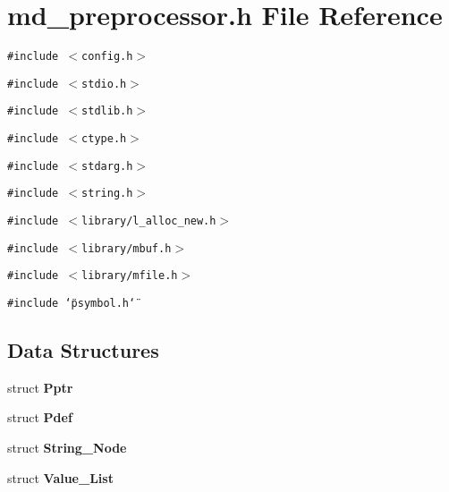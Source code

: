 \section{md\_\-preprocessor.h File Reference}
\label{md__preprocessor_8h}
{\tt \#include $<$config.h$>$}\par
{\tt \#include $<$stdio.h$>$}\par
{\tt \#include $<$stdlib.h$>$}\par
{\tt \#include $<$ctype.h$>$}\par
{\tt \#include $<$stdarg.h$>$}\par
{\tt \#include $<$string.h$>$}\par
{\tt \#include $<$library/l\_\-alloc\_\-new.h$>$}\par
{\tt \#include $<$library/mbuf.h$>$}\par
{\tt \#include $<$library/mfile.h$>$}\par
{\tt \#include \char`\"{}psymbol.h\char`\"{}}\par
\subsection*{Data Structures}
\begin{CompactItemize}
\item 
struct \bf{Pptr}
\item 
struct \bf{Pdef}
\item 
struct \bf{String\_\-Node}
\item 
struct \bf{Value\_\-List}
\end{CompactItemize}
